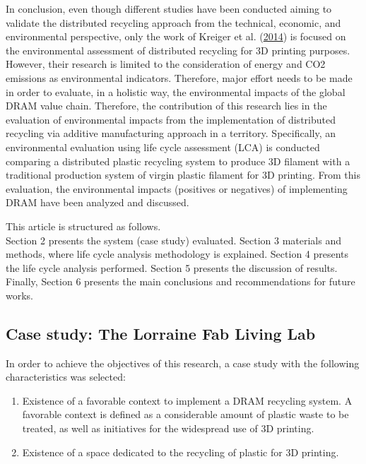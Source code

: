 \documentclass[]{elsarticle} %
\providecommand{\tightlist}{%
  \setlength{\itemsep}{0pt}\setlength{\parskip}{0pt}}
\begin{document}
In conclusion, even though different studies have been conducted aiming to validate the distributed recycling approach from the technical, economic, and environmental perspective, only the work of Kreiger et al. (\protect\hyperlink{ref-Kreiger2014}{2014}) is focused on the environmental assessment of distributed recycling for 3D printing purposes.
However, their research is limited to the consideration of energy and CO2 emissions as environmental indicators. Therefore, major effort needs to be made in order to evaluate, in a holistic way, the environmental impacts of the global DRAM value chain.
Therefore, the contribution of this research lies in the evaluation of environmental impacts from the implementation of distributed recycling via additive manufacturing approach in a territory.
Specifically, an environmental evaluation using life cycle assessment (LCA) is conducted comparing a distributed plastic recycling system to produce 3D filament with a traditional production system of virgin plastic filament for 3D printing.
From this evaluation, the environmental impacts (positives or negatives) of implementing DRAM have been analyzed and discussed.

This article is structured as follows.\\
Section 2 presents the system (case study) evaluated.
Section 3 materials and methods, where life cycle analysis methodology is explained.
Section 4 presents the life cycle analysis performed. Section 5 presents the discussion of results.
Finally, Section 6 presents the main conclusions and recommendations for future works.

\hypertarget{case-study-the-lorraine-fab-living-lab}{%
\subsection{Case study: The Lorraine Fab Living Lab}\label{case-study-the-lorraine-fab-living-lab}}

In order to achieve the objectives of this research, a case study with the following characteristics was selected:

\begin{enumerate}
\def\labelenumi{\arabic{enumi}.}
\tightlist
\item
  Existence of a favorable context to implement a DRAM recycling system. A favorable context is defined as a considerable amount of plastic waste to be treated, as well as initiatives for the widespread use of 3D printing.
\item
  Existence of a space dedicated to the recycling of plastic for 3D printing.
\end{enumerate}
\end{document}
